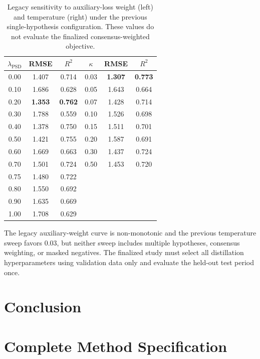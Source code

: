 \documentclass[letterpaper]{article} %
\begin{document}
\begin{table}[t]
\centering
\footnotesize
\setlength{\tabcolsep}{3.2pt}
\begin{tabular}{ccc@{\hspace{8pt}}ccc}
\toprule
\(\lambda_{\mathrm{PSD}}\) & RMSE & \(R^2\) & \(\kappa\) & RMSE & \(R^2\) \\
\midrule
0.00 & 1.407 & 0.714 & 0.03 & \textbf{1.307} & \textbf{0.773} \\
0.10 & 1.686 & 0.628 & 0.05 & 1.643 & 0.664 \\
0.20 & \textbf{1.353} & \textbf{0.762} & 0.07 & 1.428 & 0.714 \\
0.30 & 1.788 & 0.559 & 0.10 & 1.526 & 0.698 \\
0.40 & 1.378 & 0.750 & 0.15 & 1.511 & 0.701 \\
0.50 & 1.421 & 0.755 & 0.20 & 1.587 & 0.691 \\
0.60 & 1.669 & 0.663 & 0.30 & 1.437 & 0.724 \\
0.70 & 1.501 & 0.724 & 0.50 & 1.453 & 0.720 \\
0.75 & 1.480 & 0.722 & & & \\
0.80 & 1.550 & 0.692 & & & \\
0.90 & 1.635 & 0.669 & & & \\
1.00 & 1.708 & 0.629 & & & \\
\bottomrule
\end{tabular}
\caption{Legacy sensitivity to auxiliary-loss weight (left) and temperature (right) under the previous single-hypothesis configuration. These values do not evaluate the finalized consensus-weighted objective.}
\label{tab:contrastive-hparams}
\end{table}

The legacy auxiliary-weight curve is non-monotonic and the previous temperature sweep favors \(0.03\), but neither sweep includes multiple hypotheses, consensus weighting, or masked negatives. The finalized study must select all distillation hyperparameters using validation data only and evaluate the held-out test period once.

\section{Conclusion}



\appendix
\section{Complete Method Specification}
\end{document}
